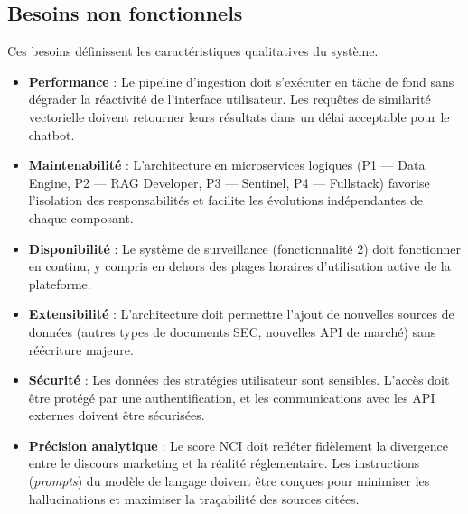 \subsection{Besoins non fonctionnels}

Ces besoins définissent les caractéristiques qualitatives du système.

\begin{itemize}
    \item \textbf{Performance} : Le pipeline d’ingestion doit s’exécuter en tâche de 
    fond sans dégrader la réactivité de l’interface utilisateur. Les requêtes de 
    similarité vectorielle doivent retourner leurs résultats dans un délai acceptable 
    pour le chatbot.

    \item \textbf{Maintenabilité} : L’architecture en microservices logiques 
    (P1 — Data Engine, P2 — RAG Developer, P3 — Sentinel, P4 — Fullstack) favorise 
    l’isolation des responsabilités et facilite les évolutions indépendantes de 
    chaque composant.

    \item \textbf{Disponibilité} : Le système de surveillance (fonctionnalité 2) doit 
    fonctionner en continu, y compris en dehors des plages horaires d’utilisation 
    active de la plateforme.

    \item \textbf{Extensibilité} : L’architecture doit permettre l’ajout de nouvelles 
    sources de données (autres types de documents SEC, nouvelles API de marché) sans 
    réécriture majeure.

    \item \textbf{Sécurité} : Les données des stratégies utilisateur sont sensibles. 
    L’accès doit être protégé par une authentification, et les communications avec 
    les API externes doivent être sécurisées.

    \item \textbf{Précision analytique} : Le score NCI doit refléter fidèlement la 
    divergence entre le discours marketing et la réalité réglementaire. Les 
    instructions (\textit{prompts}) du modèle de langage doivent être conçues pour 
    minimiser les hallucinations et maximiser la traçabilité des sources citées.
\end{itemize}
